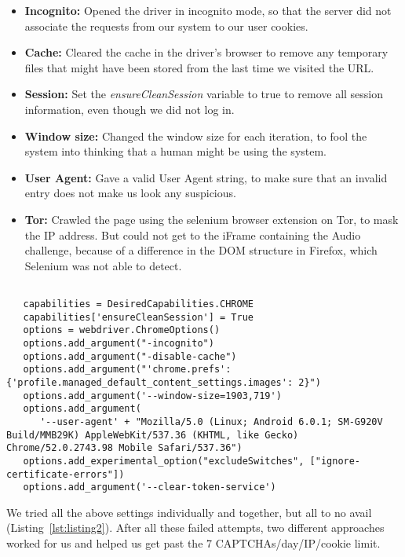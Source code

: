 \begin{itemize}

  \item \textbf{Incognito:} Opened the driver in incognito mode, so that the server did not associate the requests from our system to our user cookies.
  \item \textbf{Cache:} Cleared the cache in the driver's browser to remove any temporary files that might have been stored from the last time we visited the URL.
  \item \textbf{Session:} Set the \textit{ensureCleanSession} variable to true to remove all session information, even though we did not log in.
  \item \textbf{Window size:} Changed the window size for each iteration, to fool the system into thinking that a human might be using the system.
  \item \textbf{User Agent:} Gave a valid User Agent string, to make sure that an invalid entry does not make us look any suspicious.
  \item \textbf{Tor:} Crawled the page using the selenium browser extension on Tor, to mask the IP address. But could not get to the iFrame containing the Audio challenge, because of a difference in the DOM structure in Firefox, which Selenium was not able to detect.
\end{itemize}

\begin{lstlisting}[caption={Setting up arguments for ChromeDriver in Python using Selenium }, label={lst:listing2}]

   capabilities = DesiredCapabilities.CHROME
   capabilities['ensureCleanSession'] = True
   options = webdriver.ChromeOptions()
   options.add_argument("-incognito")
   options.add_argument("-disable-cache")
   options.add_argument("'chrome.prefs': {'profile.managed_default_content_settings.images': 2}")
   options.add_argument('--window-size=1903,719')
   options.add_argument(
      '--user-agent' + "Mozilla/5.0 (Linux; Android 6.0.1; SM-G920V Build/MMB29K) AppleWebKit/537.36 (KHTML, like Gecko) Chrome/52.0.2743.98 Mobile Safari/537.36")
   options.add_experimental_option("excludeSwitches", ["ignore-certificate-errors"])
   options.add_argument('--clear-token-service')

\end{lstlisting}
We tried all the above settings individually and together, but all to no avail (Listing~\ref{lst:listing2}). After all these failed attempts, two different approaches worked for us and helped us get past the 7 CAPTCHAs/day/IP/cookie limit.

